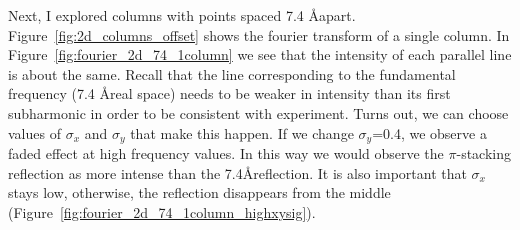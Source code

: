 \documentclass{article}
\begin{document}
Next, I explored columns with points spaced 7.4 \AA apart.
Figure~\ref{fig:2d_columns_offset} shows the fourier transform of a single
column. In Figure~\ref{fig:fourier_2d_74_1column} we see that the intensity of
each parallel line is about the same. Recall that the line corresponding to the
fundamental frequency (7.4 \AA real space) needs to be weaker in intensity than
its first subharmonic in order to be consistent with experiment. Turns out, we
can choose values of $\sigma_x$ and $\sigma_y$ that make this happen. If we 
change $\sigma_y$=0.4, we observe a faded effect at high frequency values. In this
way we would observe the $\pi$-stacking reflection as more intense than the 
7.4\AA reflection. It is also important that $\sigma_x$ stays low, otherwise, the
reflection disappears from the middle (Figure~\ref{fig:fourier_2d_74_1column_highxysig}). 
\end{document}
